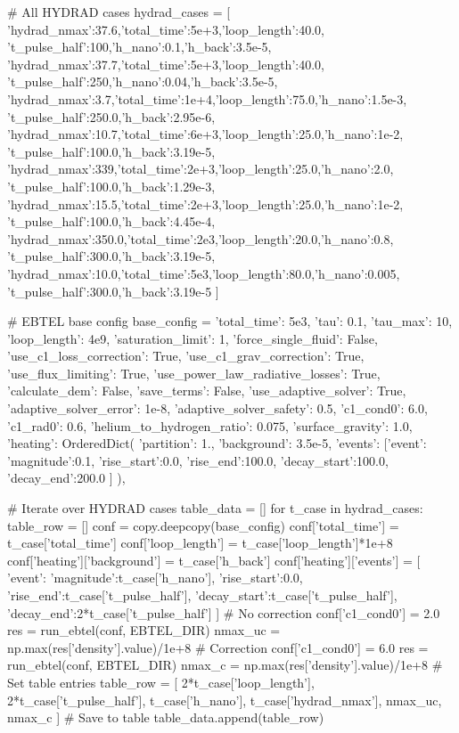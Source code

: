 \begin{pycode}[chapter2]
# All HYDRAD cases 
hydrad_cases = [
    {'hydrad_nmax':37.6,'total_time':5e+3,'loop_length':40.0,
        't_pulse_half':100,'h_nano':0.1,'h_back':3.5e-5},
    {'hydrad_nmax':37.7,'total_time':5e+3,'loop_length':40.0,
        't_pulse_half':250,'h_nano':0.04,'h_back':3.5e-5},
    {'hydrad_nmax':3.7,'total_time':1e+4,'loop_length':75.0,'h_nano':1.5e-3,
        't_pulse_half':250.0,'h_back':2.95e-6},
    {'hydrad_nmax':10.7,'total_time':6e+3,'loop_length':25.0,'h_nano':1e-2, 
        't_pulse_half':100.0,'h_back':3.19e-5},
    {'hydrad_nmax':339,'total_time':2e+3,'loop_length':25.0,'h_nano':2.0,
        't_pulse_half':100.0,'h_back':1.29e-3},
    {'hydrad_nmax':15.5,'total_time':2e+3,'loop_length':25.0,'h_nano':1e-2,
        't_pulse_half':100.0,'h_back':4.45e-4},
    {'hydrad_nmax':350.0,'total_time':2e3,'loop_length':20.0,'h_nano':0.8, 
        't_pulse_half':300.0,'h_back':3.19e-5},
    {'hydrad_nmax':10.0,'total_time':5e3,'loop_length':80.0,'h_nano':0.005,
        't_pulse_half':300.0,'h_back':3.19e-5}
]

# EBTEL base config
base_config = {
    'total_time': 5e3,
    'tau': 0.1,
    'tau_max': 10,
    'loop_length': 4e9,
    'saturation_limit': 1,
    'force_single_fluid': False,
    'use_c1_loss_correction': True,
    'use_c1_grav_correction': True,
    'use_flux_limiting': True,
    'use_power_law_radiative_losses': True,
    'calculate_dem': False,
    'save_terms': False,
    'use_adaptive_solver': True,
    'adaptive_solver_error': 1e-8,
    'adaptive_solver_safety': 0.5,
    'c1_cond0': 6.0,
    'c1_rad0': 0.6,
    'helium_to_hydrogen_ratio': 0.075,
    'surface_gravity': 1.0,
    'heating': OrderedDict({
        'partition': 1.,
        'background': 3.5e-5,
        'events': [{'event':{
            'magnitude':0.1,
            'rise_start':0.0,
            'rise_end':100.0,
            'decay_start':100.0,
            'decay_end':200.0}}
        ]
    }),
}

# Iterate over HYDRAD cases
table_data = []
for t_case in hydrad_cases:
    table_row = []
    conf = copy.deepcopy(base_config)
    conf['total_time'] = t_case['total_time']
    conf['loop_length'] = t_case['loop_length']*1e+8
    conf['heating']['background'] = t_case['h_back']
    conf['heating']['events'] = [
        {'event':{
            'magnitude':t_case['h_nano'],
            'rise_start':0.0,
            'rise_end':t_case['t_pulse_half'],
            'decay_start':t_case['t_pulse_half'],
            'decay_end':2*t_case['t_pulse_half']
        }}]
    # No correction
    conf['c1_cond0'] = 2.0
    res = run_ebtel(conf, EBTEL_DIR)
    nmax_uc = np.max(res['density'].value)/1e+8
    # Correction
    conf['c1_cond0'] = 6.0
    res = run_ebtel(conf, EBTEL_DIR)
    nmax_c = np.max(res['density'].value)/1e+8
    # Set table entries
    table_row = [
        2*t_case['loop_length'],
        2*t_case['t_pulse_half'],
        t_case['h_nano'],
        t_case['hydrad_nmax'],
        nmax_uc,
        nmax_c
    ]
    # Save to table
    table_data.append(table_row)


\end{pycode}
